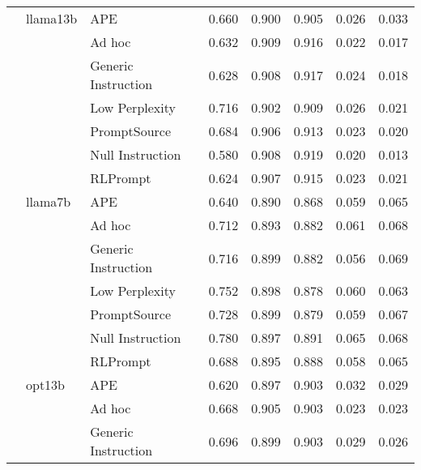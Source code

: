 \begin{supertabular}{lllrrrrr}
              & llama13b & APE &            0.660 &           0.900 &          0.905 &        0.026 &    0.033 \\
              &        & Ad hoc &            0.632 &           0.909 &          0.916 &        0.022 &    0.017 \\
              &        & Generic Instruction &            0.628 &           0.908 &          0.917 &        0.024 &    0.018 \\
              &        & Low Perplexity &            0.716 &           0.902 &          0.909 &        0.026 &    0.021 \\
              &        & PromptSource &            0.684 &           0.906 &          0.913 &        0.023 &    0.020 \\
              &        & Null Instruction &            0.580 &           0.908 &          0.919 &        0.020 &    0.013 \\
              &        & RLPrompt &            0.624 &           0.907 &          0.915 &        0.023 &    0.021 \\
              & llama7b & APE &            0.640 &           0.890 &          0.868 &        0.059 &    0.065 \\
              &        & Ad hoc &            0.712 &           0.893 &          0.882 &        0.061 &    0.068 \\
              &        & Generic Instruction &            0.716 &           0.899 &          0.882 &        0.056 &    0.069 \\
              &        & Low Perplexity &            0.752 &           0.898 &          0.878 &        0.060 &    0.063 \\
              &        & PromptSource &            0.728 &           0.899 &          0.879 &        0.059 &    0.067 \\
              &        & Null Instruction &            0.780 &           0.897 &          0.891 &        0.065 &    0.068 \\
              &        & RLPrompt &            0.688 &           0.895 &          0.888 &        0.058 &    0.065 \\
              & opt13b & APE &            0.620 &           0.897 &          0.903 &        0.032 &    0.029 \\
              &        & Ad hoc &            0.668 &           0.905 &          0.903 &        0.023 &    0.023 \\
              &        & Generic Instruction &            0.696 &           0.899 &          0.903 &        0.029 &    0.026 \\

\end{supertabular}

